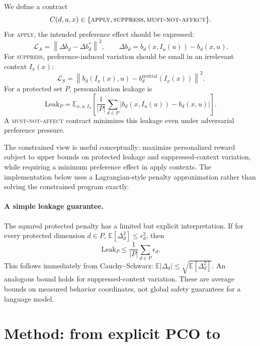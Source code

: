 We define a contract
\begin{equation}
C(d,u,x)\in\{\textsc{apply},\textsc{suppress},\textsc{must\mbox{-}not\mbox{-}affect}\}.
\end{equation}
For \textsc{apply}, the intended preference effect should be expressed:
\begin{equation}
\mathcal{L}_{A}=\left\|\Delta b_d-\Delta b_d^{*}\right\|^2,\qquad
\Delta b_d=b_d(x,I_u(u))-b_d(x,u).
\end{equation}
For \textsc{suppress}, preference-induced variation should be small in an irrelevant context $I_x(x)$:
\begin{equation}
\mathcal{L}_{S}=\left\|b_d(I_x(x),u)-b_d^{\mathrm{neutral}}(I_x(x))\right\|^2.
\end{equation}
For a protected set $P$, personalization leakage is
\begin{equation}
\mathrm{Leak}_P = \mathbb{E}_{x,u,I_u}\left[\frac{1}{|P|}\sum_{d\in P}\left|b_d(x,I_u(u))-b_d(x,u)\right|\right].
\end{equation}
A \textsc{must-not-affect} contract minimizes this leakage even under adversarial preference pressure.

The constrained view is useful conceptually: maximize personalized reward subject to upper bounds on protected leakage and suppressed-context variation, while requiring a minimum preference effect in apply contexts. The implementation below uses a Lagrangian-style penalty approximation rather than solving the constrained program exactly.

\paragraph{A simple leakage guarantee.}
The squared protected penalty has a limited but explicit interpretation. If for every protected dimension $d\in P$, $\mathbb{E}[\Delta_d^2]\le \epsilon_d^2$, then
\begin{equation}
\mathrm{Leak}_P \le \frac{1}{|P|}\sum_{d\in P}\epsilon_d.
\end{equation}
This follows immediately from Cauchy--Schwarz: $\mathbb{E}|\Delta_d|\le\sqrt{\mathbb{E}[\Delta_d^2]}$. An analogous bound holds for suppressed-context variation. These are average bounds on measured behavior coordinates, not global safety guarantees for a language model.

\section{Method: from explicit PCO to \method{}}
